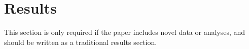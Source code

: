 \section*{Results} %
This section is only required if the paper includes novel data or analyses, and should be written as a traditional results section.

